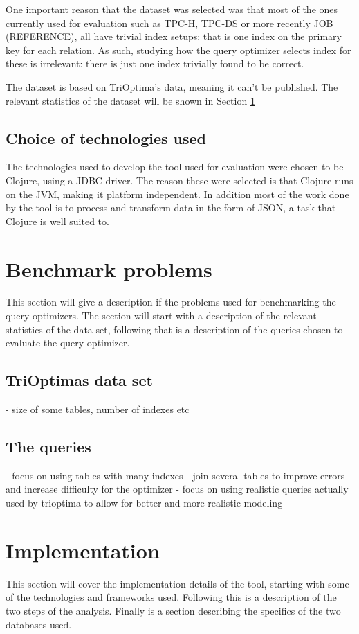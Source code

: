 One important reason that the dataset was selected was that most of the ones
currently used for evaluation such as TPC-H, TPC-DS or more recently JOB (REFERENCE), all
have trivial index setups; that is one index on the primary key for each
relation. As such, studying how the query optimizer selects index for these is
irrelevant: there is just one index trivially found to be correct.

The dataset is based on TriOptima's data, meaning it can't be published. The
relevant statistics of the dataset will be shown in Section \ref{sec:benchmark}

\subsection{Choice of technologies used}
The technologies used to develop the tool used for evaluation were chosen to be
Clojure, using a JDBC driver. The reason these were selected is that Clojure
runs on the JVM, making it platform independent. In addition most of the work
done by the tool is to process and transform data in the form of JSON, a task
that Clojure is well suited to.

\section{Benchmark problems} \label{sec:benchmark}
This section will give a description if the problems used for benchmarking the
query optimizers. The section will start with a description of the relevant
statistics of the data set, following that is a description of the queries
chosen to evaluate the query optimizer.

\subsection{TriOptimas data set}
- size of some tables, number of indexes etc

\subsection{The queries}
- focus on using tables with many indexes
- join several tables to improve errors and increase difficulty for the optimizer
- focus on using realistic queries actually used by trioptima to allow for
better and more realistic modeling

\section{Implementation}
This section will cover the implementation details of the tool, starting with
some of the technologies and frameworks used. Following this is a description of
the two steps of the analysis. Finally is a section describing the specifics of
the two databases used.

